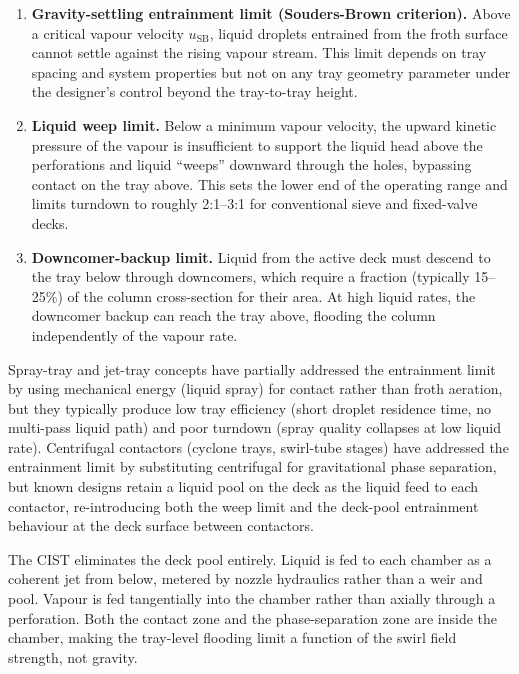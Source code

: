 \documentclass[11pt,letterpaper]{article}
\begin{document}
\begin{enumerate}[nosep]
  \item \textbf{Gravity-settling entrainment limit (Souders-Brown criterion).}
    Above a critical vapour velocity $u_{\mathrm{SB}}$, liquid droplets
    entrained from the froth surface cannot settle against the rising vapour
    stream.  This limit depends on tray spacing and system properties but not
    on any tray geometry parameter under the designer's control beyond the
    tray-to-tray height.

  \item \textbf{Liquid weep limit.}
    Below a minimum vapour velocity, the upward kinetic pressure of the vapour
    is insufficient to support the liquid head above the perforations and
    liquid ``weeps'' downward through the holes, bypassing contact on the
    tray above.  This sets the lower end of the operating range and limits
    turndown to roughly 2:1--3:1 for conventional sieve and fixed-valve decks.

  \item \textbf{Downcomer-backup limit.}
    Liquid from the active deck must descend to the tray below through
    downcomers, which require a fraction (typically 15--25\%) of the column
    cross-section for their area.  At high liquid rates, the downcomer backup
    can reach the tray above, flooding the column independently of the vapour
    rate.
\end{enumerate}

Spray-tray and jet-tray concepts have partially addressed the entrainment
limit by using mechanical energy (liquid spray) for contact rather than
froth aeration, but they typically produce low tray efficiency (short droplet
residence time, no multi-pass liquid path) and poor turndown (spray quality
collapses at low liquid rate).  Centrifugal contactors
(cyclone trays, swirl-tube stages) have addressed the entrainment limit by
substituting centrifugal for gravitational phase separation, but known
designs retain a liquid pool on the deck as the liquid feed to each
contactor, re-introducing both the weep limit and the deck-pool entrainment
behaviour at the deck surface between contactors.

The CIST eliminates the deck pool entirely.  Liquid is fed to each chamber
as a coherent jet from below, metered by nozzle hydraulics rather than a weir
and pool.  Vapour is fed tangentially into the chamber rather than axially
through a perforation.  Both the contact zone and the phase-separation zone
are inside the chamber, making the tray-level flooding limit a function of
the swirl field strength, not gravity.
\end{document}
